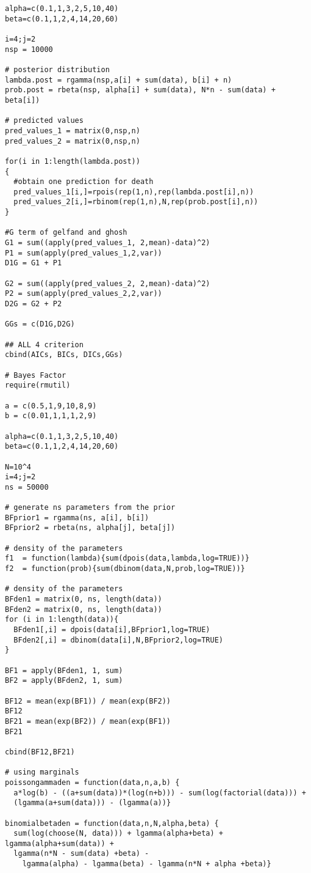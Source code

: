 \documentclass[a4paper, 11pt]{article}
\begin{document}
\begin{verbatim}
alpha=c(0.1,1,3,2,5,10,40)
beta=c(0.1,1,2,4,14,20,60)

i=4;j=2
nsp = 10000

# posterior distribution
lambda.post = rgamma(nsp,a[i] + sum(data), b[i] + n)
prob.post = rbeta(nsp, alpha[i] + sum(data), N*n - sum(data) + beta[i])

# predicted values
pred_values_1 = matrix(0,nsp,n)
pred_values_2 = matrix(0,nsp,n)

for(i in 1:length(lambda.post))
{
  #obtain one prediction for death
  pred_values_1[i,]=rpois(rep(1,n),rep(lambda.post[i],n))
  pred_values_2[i,]=rbinom(rep(1,n),N,rep(prob.post[i],n))
}

#G term of gelfand and ghosh
G1 = sum((apply(pred_values_1, 2,mean)-data)^2)
P1 = sum(apply(pred_values_1,2,var))
D1G = G1 + P1

G2 = sum((apply(pred_values_2, 2,mean)-data)^2)
P2 = sum(apply(pred_values_2,2,var))
D2G = G2 + P2

GGs = c(D1G,D2G)

## ALL 4 criterion
cbind(AICs, BICs, DICs,GGs)

# Bayes Factor
require(rmutil)

a = c(0.5,1,9,10,8,9)
b = c(0.01,1,1,1,2,9)

alpha=c(0.1,1,3,2,5,10,40)
beta=c(0.1,1,2,4,14,20,60)

N=10^4
i=4;j=2
ns = 50000

# generate ns parameters from the prior
BFprior1 = rgamma(ns, a[i], b[i])
BFprior2 = rbeta(ns, alpha[j], beta[j])

# density of the parameters
f1  = function(lambda){sum(dpois(data,lambda,log=TRUE))}
f2  = function(prob){sum(dbinom(data,N,prob,log=TRUE))}

# density of the parameters
BFden1 = matrix(0, ns, length(data))
BFden2 = matrix(0, ns, length(data))
for (i in 1:length(data)){
  BFden1[,i] = dpois(data[i],BFprior1,log=TRUE)
  BFden2[,i] = dbinom(data[i],N,BFprior2,log=TRUE)
}

BF1 = apply(BFden1, 1, sum)
BF2 = apply(BFden2, 1, sum)

BF12 = mean(exp(BF1)) / mean(exp(BF2))
BF12
BF21 = mean(exp(BF2)) / mean(exp(BF1))
BF21

cbind(BF12,BF21)

# using marginals 
poissongammaden = function(data,n,a,b) {
  a*log(b) - ((a+sum(data))*(log(n+b))) - sum(log(factorial(data))) + 
  (lgamma(a+sum(data))) - (lgamma(a))}

binomialbetaden = function(data,n,N,alpha,beta) {
  sum(log(choose(N, data))) + lgamma(alpha+beta) + lgamma(alpha+sum(data)) +
  lgamma(n*N - sum(data) +beta) -
    lgamma(alpha) - lgamma(beta) - lgamma(n*N + alpha +beta)}


\end{verbatim}
\end{document}
